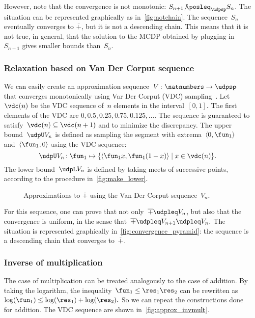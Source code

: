 However, note that the convergence is not monotonic: $S_{n+1}{\not\posleq}_{\udpsp}S_{n}.
$
The situation can be represented graphically as in~\cref{fig:notchain}.
The sequence~$S_{n}$ eventually converges to $\overline{+}$, but
it is not a descending chain.
This means that it is not true, in general,
that the solution to the MCDP obtained by plugging in~$S_{n+1}$
gives smaller bounds than~$S_{n}$.

\subsubsection*{Relaxation based on Van Der Corput sequence}

We can easily create an approximation sequence~$V:\natnumbers\to\udpsp$
that converges monotonically using Var Der Corput (VDC) sampling~\cite[Section 5.2]{LaValle2006Planning}.
Let~$\vdc(n)$ be the VDC sequence of~$n$ elements in the interval~$[0,1]$.
The first elements of the VDC are $0,0.5,0.25,0.75,0.125,\dots$.
The sequence is guaranteed to satisfy~$\vdc(n)\subseteq\vdc(n+1)$
and to minimize the discrepancy.
The upper bound~$\udpU V_{n}$
is defined as sampling the segment with extrema~$\left\langle 0,\fun_{1}\right\rangle $
and~$\left\langle \fun_{1},0\right\rangle $ using the VDC sequence:
\[
    \udpU V_{n}\colon\fun_{1}\mapsto\{\left\langle \fun_{1}x,\fun_{1}(1-x)\right\rangle \mid x\in\vdc(n)\}.
\]
The lower bound~$\udpL V_{n}$ is defined by taking meets of successive
points, according to the procedure in~\cref{fig:make_lower}.

\begin{figure}[h]
    \centering
    \caption{Approximations to $\overline{+}$ using the Van Der
        Corput sequence~$V_{n}$.}
    \label{fig:Vn}
\end{figure}

For this sequence, one can prove that not only~$\overline{+}\udpleq V_{n}$,
but also that the convergence is uniform, in the sense that~$\overline{+}\udpleq V_{n+1}\udpleq V_{n}.
$
The situation is represented graphically in~\cref{fig:convergence_pyramid}:
the sequence is a descending chain that converges to~$\overline{+}$.

\subsubsection{Inverse of multiplication}

The case of multiplication can be treated analogously to the case
of addition.
By taking the logarithm, the inequality~$\fun_{1}\leq\res_{1}\res_{2}$
can be rewritten as~$\log(\fun_{1})\leq\log(\res_{1})+\log(\res_{2}).
$
So we can repeat the constructions done for addition.
The VDC sequence
are shown in~\cref{fig:approx_invmult}.

